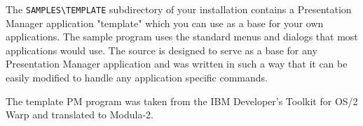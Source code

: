 The \verb'SAMPLES\TEMPLATE' subdirectory of your installation contains
a Presentation Manager application "template" which you can use as
a base for your own applications. The sample program uses the
standard menus and dialogs that most applications would use.
The source is designed to serve as a base for any Presentation
Manager application and was written in such a way that it can be
easily modified to handle any application specific commands.

The template PM program was taken from the IBM Developer's Toolkit for
OS/2 Warp and translated to Modula-2.

